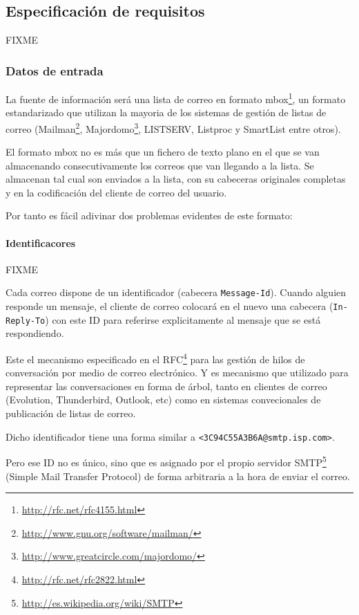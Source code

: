 
\subsection{Especificación de requisitos}

FIXME

\subsubsection{Datos de entrada}

La fuente de información será una lista de correo en formato
mbox\footnote{\url{http://rfc.net/rfc4155.html}}, un formato estandarizado
que utilizan la mayoria de los sistemas de gestión de listas de correo
(Mailman\footnote{\url{http://www.gnu.org/software/mailman/}}, 
Majordomo\footnote{\url{http://www.greatcircle.com/majordomo/}},
LISTSERV, Listproc y SmartList entre otros).

El formato mbox no es más que un fichero de texto plano en el que se van
almacenando consecutivamente los correos que van llegando a la lista. Se 
almacenan tal cual son enviados a la lista, con su cabeceras originales 
completas y en la codificación del cliente de correo del usuario.

Por tanto es fácil adivinar dos problemas evidentes de este formato:

\paragraph{Identificacores}

FIXME

Cada correo dispone de un identificador (cabecera \texttt{Message-Id}). Cuando
alguien responde un mensaje, el cliente de correo colocará en el nuevo una 
cabecera (\texttt{In-Reply-To}) con este ID para referirse explicitamente al 
mensaje que se está respondiendo.

Este el mecanismo especificado en el RFC\footnote{\url{http://rfc.net/rfc2822.html}} 
para las gestión de hilos de conversación por medio de correo electrónico. Y es
mecanismo que utilizado para representar las conversaciones en forma de árbol, 
tanto en clientes de correo (Evolution, Thunderbird, Outlook, etc) como en sistemas 
convecionales de publicación de listas de correo.

Dicho identificador tiene una forma similar a \texttt{<3C94C55A3B6A@smtp.isp.com>}.

Pero ese ID no es único, sino que es asignado por el propio servidor
SMTP\footnote{\url{http://es.wikipedia.org/wiki/SMTP}} (Simple Mail Transfer Protocol) 
de forma arbitraria a la hora de enviar el correo.

